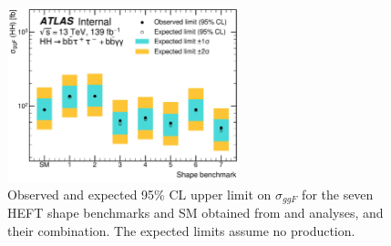 \documentclass[twoside,11pt]{report}
\begin{document}
\begin{figure}[tbh!]
    \centering
    \includegraphics[width=0.6\textwidth]{casual plots/combined_benchmark_limit.pdf}
    \caption{Observed and expected 95\% CL upper limit on $\sigma_{ggF}$ for the seven HEFT shape benchmarks and SM  obtained from \bbtautau and \bbyy analyses, and their combination. The expected limits assume no \HH production.}
    \label{fig:results:combined_BM}
\end{figure}
\end{document}
